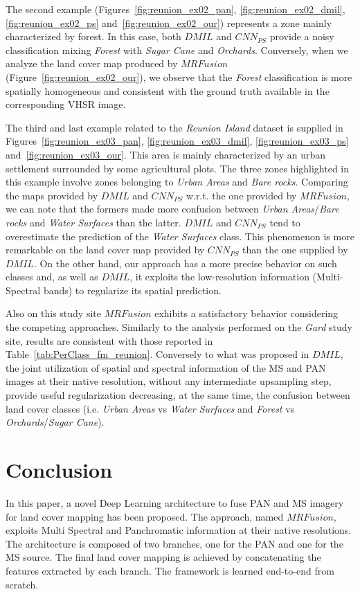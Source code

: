 \documentclass[journal]{IEEEtran}
\newcommand{\method}{$MRFusion$}
\begin{document}
The second example (Figures~\ref{fig:reunion_ex02_pan}, \ref{fig:reunion_ex02_dmil}, \ref{fig:reunion_ex02_ps} and~\ref{fig:reunion_ex02_our}) represents a zone mainly characterized by forest. In this case, both $DMIL$ and $CNN_{PS}$ provide a noisy classification mixing \textit{Forest} with \textit{Sugar Cane} and \textit{Orchards}.
Conversely, when we analyze the land cover map produced by \method{} (Figure~\ref{fig:reunion_ex02_our}), we observe that the \textit{Forest} classification is more spatially homogeneous and consistent with the ground truth available in the corresponding VHSR image.

The third and last example related to the \textit{Reunion Island} dataset is supplied in Figures~\ref{fig:reunion_ex03_pan}, \ref{fig:reunion_ex03_dmil}, \ref{fig:reunion_ex03_ps} and~\ref{fig:reunion_ex03_our}. This area is mainly characterized by an urban settlement surrounded by some agricultural plots. The three zones highlighted in this example involve zones belonging to \textit{Urban Areas} and \textit{Bare rocks}. Comparing the maps provided by $DMIL$ and $CNN_{PS}$ w.r.t. the one provided by \method{}, we can note that the formers made more confusion between \textit{Urban Areas}/\textit{Bare rocks} and \textit{Water Surfaces} than the latter.
$DMIL$ and $CNN_{PS}$ tend to overestimate the prediction of the \textit{Water Surfaces} class. This phenomenon is more remarkable on the land cover map provided by $CNN_{PS}$ than the one supplied by $DMIL$. On the other hand, our approach has a more precise behavior on such classes and, as well as $DMIL$, it exploits the low-resolution information (Multi-Spectral bands) to regularize its spatial prediction.

Also on this study site \method{} exhibits a satisfactory behavior considering the competing approaches. Similarly to the analysis performed on the \textit{Gard} study site, results are consistent with those reported in Table~\ref{tab:PerClass_fm_reunion}. Conversely to what was proposed in $DMIL$, the joint utilization of spatial and spectral information of the MS and PAN images at their native resolution, without any intermediate upsampling step, provide useful regularization decreasing, at the same time, the confusion between land cover classes (i.e. \textit{Urban Areas} vs \textit{Water Surfaces} and \textit{Forest} vs \textit{Orchards}/\textit{Sugar Cane}). 

\section{Conclusion}
\label{sec:conclu}
In this paper, a novel Deep Learning architecture to fuse PAN and MS imagery for land cover mapping has been proposed. The approach, named \method{}, exploits Multi Spectral and Panchromatic information at their native resolutions. The architecture is composed of two branches, one for the PAN and one for the MS source. The final land cover mapping is achieved by concatenating the features extracted by each branch.%
The framework is learned end-to-end from scratch.
\end{document}
